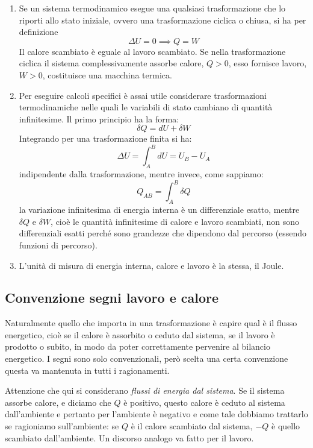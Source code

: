 \documentclass[class=book, crop=false, oneside, 12pt]{standalone}
\begin{document}
\begin{enumerate}
    \item Se un sistema termodinamico esegue una qualsiasi trasformazione che lo riporti allo stato iniziale, ovvero una trasformazione ciclica o chiusa, si ha per definizione
    \begin{equation}
        \Delta U = 0 \implies Q = W
    \end{equation}
    Il calore scambiato è eguale al lavoro scambiato. 
    Se nella trasformazione ciclica il sistema complessivamente assorbe calore, \(Q > 0\), esso fornisce lavoro, \(W > 0\), costituisce una macchina termica. 
    \item Per eseguire calcoli specifici è assai utile considerare trasformazioni termodinamiche nelle quali le variabili di stato cambiano di quantità infinitesime.
    Il primo principio ha la forma:
    \begin{equation*}
        \delta Q = d U + \delta W
    \end{equation*}
    Integrando per una trasformazione finita si ha:
    \begin{equation*}
        \Delta U = \int_A^B d U = U_B - U_A
    \end{equation*}
    indipendente dalla trasformazione, mentre invece, come sappiamo:
    \begin{equation*}
        Q_{AB} = \int_A^B \delta Q
    \end{equation*}
    la variazione infinitesima di energia interna è un differenziale esatto, mentre \(\delta Q \) e \(\delta W\), cioè le quantità infinitesime di calore e lavoro scambiati, non sono differenziali esatti perché sono grandezze che dipendono dal percorso (essendo funzioni di percorso).
    \item L'unità di misura di energia interna, calore e lavoro è la stessa, il Joule.
\end{enumerate}

\subsection{Convenzione segni lavoro e calore}

Naturalmente quello che importa in una trasformazione è capire qual è il flusso energetico, cioè se il calore è assorbito o ceduto dal sistema, se il lavoro è prodotto o subito, in modo da poter correttamente pervenire al bilancio energetico. 
I segni sono solo convenzionali, però scelta una certa convenzione questa va mantenuta in tutti i ragionamenti.

Attenzione che qui si considerano \emph{flussi di energia dal sistema}. 
Se il sistema assorbe calore, e diciamo che \(Q\) è positivo, questo calore è ceduto al sistema dall'ambiente e pertanto per l'ambiente è negativo e come tale dobbiamo trattarlo se ragioniamo sull'ambiente: se \(Q\) è il calore scambiato dal sistema, \(-Q\) è  quello scambiato dall'ambiente. 
Un discorso analogo va fatto per il lavoro.
\end{document}
